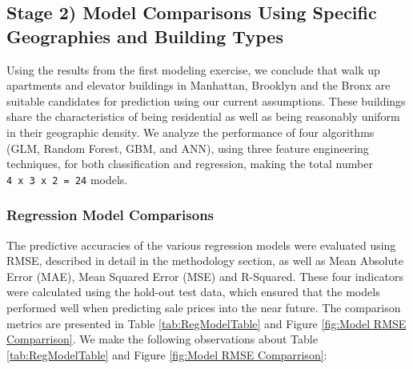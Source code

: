 \documentclass[conference,final,]{IEEEtran}
\begin{document}
\hypertarget{stage-2-model-comparisons-using-specific-geographies-and-building-types}{%
\subsection{Stage 2) Model Comparisons Using Specific Geographies and
Building
Types}\label{stage-2-model-comparisons-using-specific-geographies-and-building-types}}

Using the results from the first modeling exercise, we conclude that
walk up apartments and elevator buildings in Manhattan, Brooklyn and the
Bronx are suitable candidates for prediction using our current
assumptions. These buildings share the characteristics of being
residential as well as being reasonably uniform in their geographic
density. We analyze the performance of four algorithms (GLM, Random
Forest, GBM, and ANN), using three feature engineering techniques, for
both classification and regression, making the total number
\texttt{4\ x\ 3\ x\ 2\ =\ 24} models.

\hypertarget{regression-model-comparisons}{%
\subsubsection{Regression Model
Comparisons}\label{regression-model-comparisons}}

The predictive accuracies of the various regression models were
evaluated using RMSE, described in detail in the methodology section, as
well as Mean Absolute Error (MAE), Mean Squared Error (MSE) and
R-Squared. These four indicators were calculated using the hold-out test
data, which ensured that the models performed well when predicting sale
prices into the near future. The comparison metrics are presented in
Table \ref{tab:RegModelTable} and Figure
\ref{fig:Model RMSE Comparrison}. We make the following observations
about Table \ref{tab:RegModelTable} and Figure
\ref{fig:Model RMSE Comparrison}:
\end{document}

